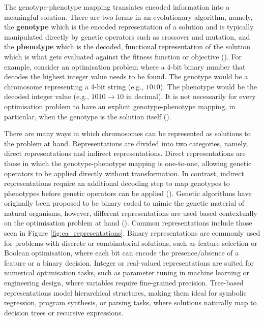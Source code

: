 \parbreak\noindent The genotype-phenotype mapping translates encoded information into a meaningful solution. There are two forms in an evolutionary algorithm, namely, the \textbf{genotype} which is the encoded representation of a solution and is typically manipulated directly by genetic operators such as crossover and mutation, and the \textbf{phenotype} which is the decoded, functional representation of the solution which is what gets evaluated against the fitness function or objective (\cite{okramergeneticalgorithms}). For example, consider an optimisation problem where a 4-bit binary number that decodes the highest integer value needs to be found. The genotype would be a chromosome representing a 4-bit string (e.g., $1010$). The phenotype would be the decoded integer value (e.g., $1010 \rightarrow 10$ in decimal). It is not necessarily for every optimisation problem to have an explicit genotype-phenotype mapping, in particular, when the genotype is the solution itself (\cite{okramergeneticalgorithms}).

\parbreak\noindent There are many ways in which chromosomes can be represented as solutions to the problem at hand. Representations are divided into two categories, namely, direct representations and indirect representations. Direct representations are those in which the genotype-phenotype mapping is one-to-one, allowing genetic operators to be applied directly without transformation. In contrast, indirect representations require an additional decoding step to map genotypes to phenotypes before genetic operators can be applied (\cite{rothlauf2009representations}). Genetic algorithms have originally been proposed to be binary coded to mimic the genetic material of natural organisms, however, different representations are used based contextually on the optimisation problem at hand (\cite{yu2010introduction}). Common representations include those seen in Figure \ref{fig:ea_representations}. Binary representations are commonly used for problems with discrete or combinatorial solutions, such as feature selection or Boolean optimisation, where each bit can encode the presence/absence of a feature or a binary decision. Integer or real-valued representations are suited for numerical optimisation tasks, such as parameter tuning in machine learning or engineering design, where variables require fine-grained precision. Tree-based representations model hierarchical structures, making them ideal for symbolic regression, program synthesis, or parsing tasks, where solutions naturally map to decision trees or recursive expressions.

